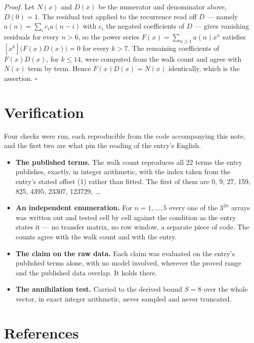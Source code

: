 \documentclass[11pt]{article}
\theoremstyle{definition}
\begin{document}
{\itshape Proof.} Let $N(x)$ and $D(x)$ be the numerator and denominator above, $D(0)=1$. The residual test applied to the recurrence read off $D$ --- namely $a(n) = \sum_i c_i a(n-i)$ with $c_i$ the negated coefficients of $D$ --- gives vanishing residuals for every $n > 6$, so the power series $F(x)=\sum_{n\ge 1}a(n)x^n$ satisfies $[x^k]\bigl(F(x)D(x)\bigr) = 0$ for every $k > 7$. The remaining coefficients of $F(x)D(x)$, for $k \le 14$, were computed from the walk count and agree with $N(x)$ term by term. Hence $F(x)D(x) = N(x)$ identically, which is the assertion. $\square$

\section{Verification}

Four checks were run, each reproducible from the code accompanying this note, and the first two are what pin the reading of the entry's English.

\begin{itemize}

\item {\bfseries The published terms.} The walk count reproduces all 22 terms the entry publishes, exactly, in integer arithmetic, with the index taken from the entry's stated offset (1) rather than fitted. The first of them are 0, 9, 27, 159, 825, 4395, 23307, 123729,~\dots

\item {\bfseries An independent enumeration.} For $n = 1,\dots,5$ every one of the $3^{2n}$ arrays was written out and tested cell by cell against the condition as the entry states it --- no transfer matrix, no row window, a separate piece of code. The counts agree with the walk count and with the entry.

\item {\bfseries The claim on the raw data.} Each claim was evaluated on the entry's published terms alone, with no model involved, wherever the proved range and the published data overlap. It holds there.

\item {\bfseries The annihilation test.} Carried to the derived bound $S = 8$ over the whole vector, in exact integer arithmetic, never sampled and never truncated.

\end{itemize}

\section{References}
\end{document}
